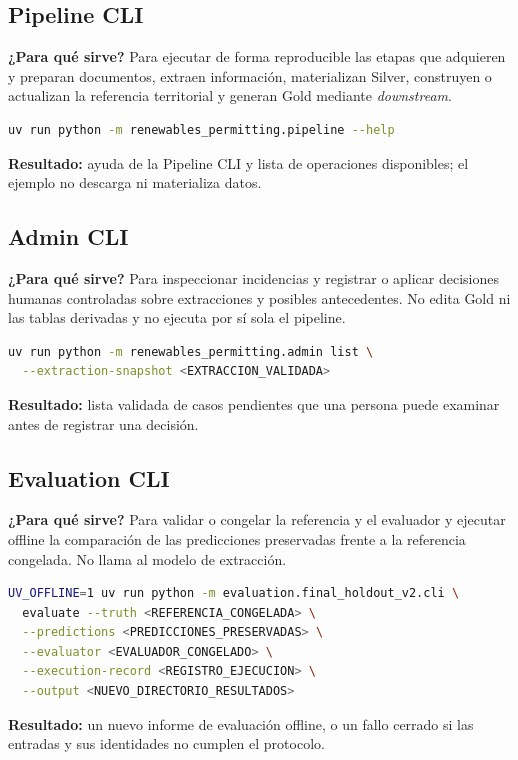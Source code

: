 \subsection*{Pipeline CLI}
\textbf{¿Para qué sirve?} Para ejecutar de forma reproducible las etapas
que adquieren y preparan documentos, extraen información, materializan Silver,
construyen o actualizan la referencia territorial y generan Gold mediante
\emph{downstream}.

\begin{lstlisting}[language=bash,title={Ejemplo:}]
uv run python -m renewables_permitting.pipeline --help
\end{lstlisting}
\textbf{Resultado:} ayuda de la Pipeline CLI y lista de operaciones disponibles;
el ejemplo no descarga ni materializa datos.

\subsection*{Admin CLI}
\textbf{¿Para qué sirve?} Para inspeccionar incidencias y registrar o aplicar
decisiones humanas controladas sobre extracciones y posibles antecedentes. No
edita Gold ni las tablas derivadas y no ejecuta por sí sola el pipeline.

\begin{lstlisting}[language=bash,title={Ejemplo:}]
uv run python -m renewables_permitting.admin list \
  --extraction-snapshot <EXTRACCION_VALIDADA>
\end{lstlisting}
\textbf{Resultado:} lista validada de casos pendientes que una persona puede
examinar antes de registrar una decisión.

\subsection*{Evaluation CLI}
\textbf{¿Para qué sirve?} Para validar o congelar la referencia y el evaluador
y ejecutar offline la comparación de las predicciones preservadas frente a la
referencia congelada. No llama al modelo de extracción.

\begin{lstlisting}[language=bash,title={Ejemplo:}]
UV_OFFLINE=1 uv run python -m evaluation.final_holdout_v2.cli \
  evaluate --truth <REFERENCIA_CONGELADA> \
  --predictions <PREDICCIONES_PRESERVADAS> \
  --evaluator <EVALUADOR_CONGELADO> \
  --execution-record <REGISTRO_EJECUCION> \
  --output <NUEVO_DIRECTORIO_RESULTADOS>
\end{lstlisting}
\textbf{Resultado:} un nuevo informe de evaluación offline, o un fallo cerrado
si las entradas y sus identidades no cumplen el protocolo.

